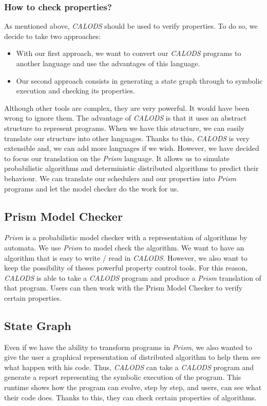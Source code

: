 \documentclass{article}
\begin{document}
\subsubsection{How to check properties?}
As mentioned above, \textit{CALODS} should be used to verify properties. To do so, we decide to take two approaches:
\begin{itemize}
  \item With our first approach, we want to convert our \textit{CALODS} programs to another language and use the advantages of this language.
  \item Our second approach consists in generating a state graph through to symbolic execution and checking its properties.
\end{itemize}
Although other tools are complex, they are very powerful. It would have been wrong to ignore them. The advantage of \textit{CALODS} is that it uses an abstract structure to represent programs. When we have this structure, we can easily translate our structure into other languages. Thanks to this, \textit{CALODS} is very extensible and, we can add more languages if we wish. However, we have decided to focus our translation on the \textit{Prism} language. It allows us to simulate probabilistic algorithms and deterministic distributed algorithms to predict their behaviour. We can translate our schedulers and our properties into \textit{Prism} programs and let the model checker do the work for us.

\subsection{Prism Model Checker}
\textit{Prism} is a probabilistic model checker with a representation of algorithms by automata. We use \textit{Prism} to model check the algorithm. We want to have an algorithm that is easy to write / read in \textit{CALODS}. However, we also want to keep the possibility of theses powerful property control tools. For this reason, \textit{CALODS} is able to take a \textit{CALODS} program and produce a \textit{Prism} translation of that program. Users can then work with the Prism Model Checker to verify certain properties.

\subsection{State Graph}
Even if we have the ability to transform programs in \textit{Prism}, we also wanted to give the user a graphical representation of distributed algorithm to help them see what happen with his code. Thus, \textit{CALODS} can take a \textit{CALODS} program and generate a report representing the symbolic execution of the program. This runtime shows how the program can evolve, step by step, and users, can see what their code does. Thanks to this, they can check certain properties of algorithms.
\end{document}
